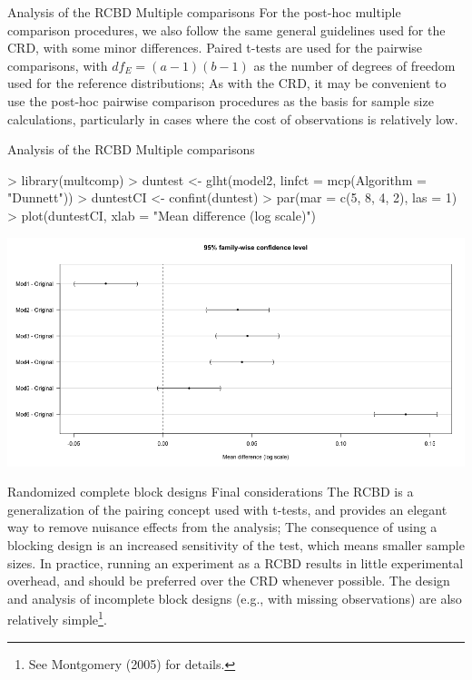 \documentclass[t]{beamer}
\begin{document}

\begin{ftst}
{Analysis of the RCBD}
{Multiple comparisons}
For the post-hoc multiple comparison procedures, we also follow the same general guidelines used for the CRD, with some minor differences.
\vone
Paired t-tests are used for the pairwise comparisons, with $df_E = (a-1)(b-1)$ as the number of degrees of freedom used for the reference distributions;
\vone
As with the CRD, it may be convenient to use the post-hoc pairwise comparison procedures as the basis for sample size calculations, particularly in cases where the cost of observations is relatively low.
\end{ftst}


\begin{ftstf}
{Analysis of the RCBD}
{Multiple comparisons}
\begin{rcode}
> library(multcomp)
> duntest     <- glht(model2, linfct = mcp(Algorithm = "Dunnett"))
> duntestCI   <- confint(duntest)
> par(mar = c(5, 8, 4, 2), las = 1)
> plot(duntestCI, xlab = "Mean difference (log scale)")
\end{rcode}
\centering\includegraphics[width=\textwidth]{../figs/algo_mcp.png}
\end{ftstf}


\begin{ftst}
{Randomized complete block designs}
{Final considerations}
The RCBD is a generalization of the pairing concept used with t-tests, and provides an elegant way to remove nuisance effects from the analysis;
\vone
The consequence of using a blocking design is an increased sensitivity of the test, which means smaller sample sizes.
\vone
In practice, running an experiment as a RCBD results in little experimental overhead, and should be preferred over the CRD whenever possible.
\vone
The design and analysis of incomplete block designs (e.g., with missing observations) are also relatively simple\footnote{\tiny See Montgomery (2005) for details.}.
\end{ftst}
\end{document}
